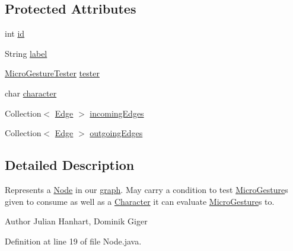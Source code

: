 \subsection*{Protected Attributes}
\begin{DoxyCompactItemize}
\item 
int \hyperlink{classch_1_1zhaw_1_1ba10__bsha__1_1_1graph_1_1Node_a6ac4c87055132ff5de2f303d64baf0ba}{id}
\item 
String \hyperlink{classch_1_1zhaw_1_1ba10__bsha__1_1_1graph_1_1Node_a02527090afc270a47397d31fedb70375}{label}
\item 
\hyperlink{classch_1_1zhaw_1_1ba10__bsha__1_1_1service_1_1MicroGestureTester}{MicroGestureTester} \hyperlink{classch_1_1zhaw_1_1ba10__bsha__1_1_1graph_1_1Node_abec03ba4df889f23c0d30d70edee59f6}{tester}
\item 
char \hyperlink{classch_1_1zhaw_1_1ba10__bsha__1_1_1graph_1_1Node_ab6bd424b381dc0f19d9f49d0b2cb56fc}{character}
\item 
Collection$<$ \hyperlink{classch_1_1zhaw_1_1ba10__bsha__1_1_1graph_1_1Edge}{Edge} $>$ \hyperlink{classch_1_1zhaw_1_1ba10__bsha__1_1_1graph_1_1Node_a588bea1c6cceb5f66e5e25115b9b12be}{incomingEdges}
\item 
Collection$<$ \hyperlink{classch_1_1zhaw_1_1ba10__bsha__1_1_1graph_1_1Edge}{Edge} $>$ \hyperlink{classch_1_1zhaw_1_1ba10__bsha__1_1_1graph_1_1Node_a130b2d1b8b68b2fe91d3753b23c766e2}{outgoingEdges}
\end{DoxyCompactItemize}


\subsection{Detailed Description}
Represents a \hyperlink{classch_1_1zhaw_1_1ba10__bsha__1_1_1graph_1_1Node}{Node} in our \hyperlink{namespacech_1_1zhaw_1_1ba10__bsha__1_1_1graph}{graph}. May carry a condition to test \hyperlink{}{MicroGesture}s given to consume as well as a \hyperlink{classch_1_1zhaw_1_1ba10__bsha__1_1_1Character}{Character} it can evaluate \hyperlink{}{MicroGesture}s to.

\begin{DoxyAuthor}{Author}
Julian Hanhart, Dominik Giger 
\end{DoxyAuthor}


Definition at line 19 of file Node.java.

